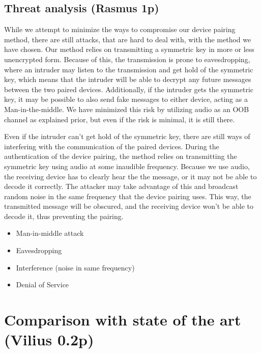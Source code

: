 \documentclass[12pt]{article}
\begin{document}
\subsection{Threat analysis (Rasmus 1p)}
\label{sub:Threat analysis}

While we attempt to minimize the ways to compromise our device pairing method, there are still attacks, that are hard to deal with, with the method we have chosen. Our method relies on transmitting a symmetric key in more or less unencrypted form. Because of this, the transmission is prone to eavesdropping, where an intruder may listen to the transmission and get hold of the symmetric key, which means that the intruder will be able to decrypt any future messages between the two paired devices. Additionally, if the intruder gets the symmetric key, it may be possible to also send fake messages to either device, acting as a Man-in-the-middle. We have minimized this risk by utilizing audio as an OOB channel as explained prior, but even if the risk is minimal, it is still there.

Even if the intruder can't get hold of the symmetric key, there are still ways of interfering with the communication of the paired devices. During the authentication of the device pairing, the method relies on transmitting the symmetric key using audio at some inaudible frequency. Because we use audio, the receiving device has to clearly hear the the message, or it may not be able to decode it correctly. The attacker may take advantage of this and broadcast random noise in the same frequency that the device pairing uses. This way, the transmitted message will be obscured, and the receiving device won't be able to decode it, thus preventing the pairing.





\begin{itemize}
    \item Man-in-middle attack
    \item Eavesdropping
    \item Interference (noise in same frequency)
    \item Denial of Service
\end{itemize}

\newpage

\section{Comparison with state of the art (Vilius 0.2p)}
\label{sec:Comparison with state of the art}
\end{document}
